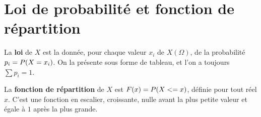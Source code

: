\section{Loi de probabilité et fonction de répartition}

\begin{definition}
La \textbf{loi} de $X$ est la donnée, pour chaque valeur $x_{i}$ de
$X(\Omega)$, de la probabilité $p_{i} = P\!\left(X = x_{i}\right)$. On la présente
sous forme de tableau, et l'on a toujours
$\sum p_{i} = 1$.
\end{definition}

\begin{definition}
La \textbf{fonction de répartition} de $X$ est
$F(x) = P\!\left(X <= x\right)$, définie pour tout réel $x$. C'est une fonction en
escalier, croissante, nulle avant la plus petite valeur et égale à $1$ après
la plus grande.
\end{definition}

